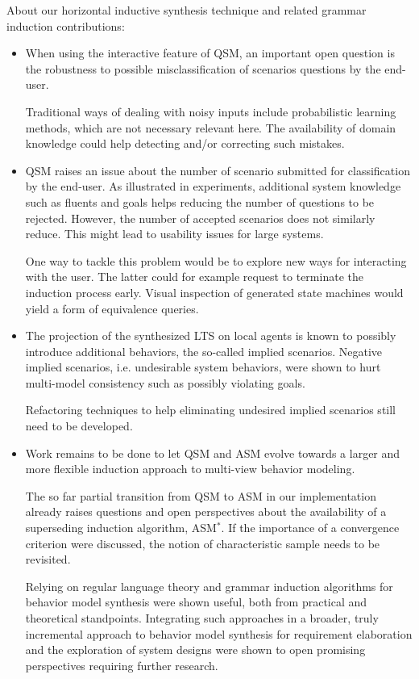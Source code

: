 About our horizontal inductive synthesis technique and related grammar induction contributions:
\begin{itemize}

\item When using the interactive feature of QSM, an important open question is the robustness to possible misclassification of scenarios questions by the end-user. 

Traditional ways of dealing with noisy inputs include probabilistic learning methods, which are not necessary relevant here. The availability of domain knowledge could help detecting and/or correcting such mistakes.

\item QSM raises an issue about the number of scenario submitted for classification by the end-user. As illustrated in experiments, additional system knowledge such as fluents and goals helps reducing the number of questions to be rejected. However, the number of accepted scenarios does not similarly reduce. This might lead to usability issues for large systems.

One way to tackle this problem would be to explore new ways for interacting with the user. The latter could for example request to terminate the induction process early. Visual inspection of generated state machines would yield a form of equivalence queries. 

\item The projection of the synthesized LTS on local agents is known to possibly introduce additional behaviors, the so-called implied scenarios. Negative implied scenarios, i.e. undesirable system behaviors, were shown to hurt multi-model consistency such as possibly violating goals. 

Refactoring techniques to help eliminating undesired implied scenarios still need to be developed.

\item Work remains to be done to let QSM and ASM evolve towards a larger and more flexible induction approach to multi-view behavior modeling.

The so far partial transition from QSM to ASM in our implementation already raises questions and open perspectives about the availability of a superseding induction algorithm, ASM$^*$. If the importance of a convergence criterion were discussed, the notion of characteristic sample needs to be revisited.

Relying on regular language theory and grammar induction algorithms for behavior model synthesis were shown useful, both from practical and theoretical standpoints. Integrating such approaches in a broader, truly incremental approach to behavior model synthesis for requirement elaboration and the exploration of system designs were shown to open promising perspectives requiring further research.

\end{itemize}
